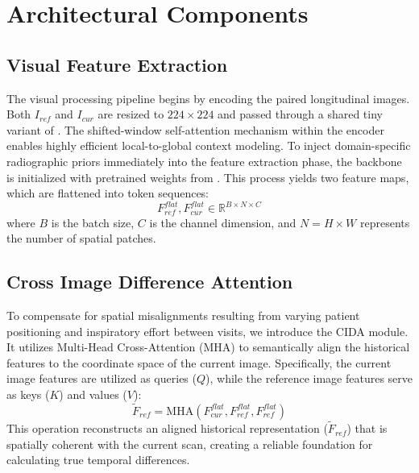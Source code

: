 \section{Architectural Components}

\subsection{Visual Feature Extraction}
The visual processing pipeline begins by encoding the paired longitudinal images. Both $I_{ref}$ and $I_{cur}$ are resized to $224 \times 224$ and passed through a shared tiny variant of \cite{swin}. The shifted-window self-attention mechanism within the encoder enables highly efficient local-to-global context modeling. To inject domain-specific radiographic priors immediately into the feature extraction phase, the backbone is initialized with pretrained weights from \cite{cxr-clip}. This process yields two feature maps, which are flattened into token sequences:
\begin{equation}
	F_{ref}^{flat}, F_{cur}^{flat} \in \mathbb{R}^{B \times N \times C}
\end{equation}
where $B$ is the batch size, $C$ is the channel dimension, and $N = H \times W$ represents the number of spatial patches.

\subsection{Cross Image Difference Attention}
To compensate for spatial misalignments resulting from varying patient positioning and inspiratory effort between visits, we introduce the CIDA module. It utilizes Multi-Head Cross-Attention (MHA) to semantically align the historical features to the coordinate space of the current image. Specifically, the current image features are utilized as queries ($Q$), while the reference image features serve as keys ($K$) and values ($V$):
\begin{equation}
	\tilde{F}_{ref} = \text{MHA}(F_{cur}^{flat}, F_{ref}^{flat}, F_{ref}^{flat})
\end{equation}
This operation reconstructs an aligned historical representation ($\tilde{F}_{ref}$) that is spatially coherent with the current scan, creating a reliable foundation for calculating true temporal differences.

